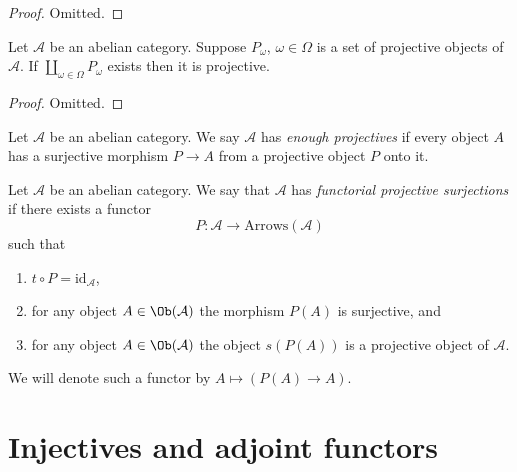 \begin{proof}
Omitted.
\end{proof}

\begin{lemma}
\label{lemma-coproduct-projectives}
Let $\mathcal{A}$ be an abelian category.
Suppose $P_\omega$, $\omega \in \Omega$ is a set of projective
objects of $\mathcal{A}$. If $\coprod_{\omega \in \Omega} P_\omega$
exists then it is projective.
\end{lemma}

\begin{proof}
Omitted.
\end{proof}

\begin{definition}
\label{definition-enough-projectives}
Let $\mathcal{A}$ be an abelian category.
We say $\mathcal{A}$ has {\it enough projectives}
if every object $A$ has a surjective morphism
$P \to A$ from a projective object $P$ onto it.
\end{definition}

\begin{definition}
\label{definition-functorial-projective-surjections}
Let $\mathcal{A}$ be an abelian category.
We say that $\mathcal{A}$ has {\it functorial projective surjections}
if there exists a functor
$$
P : \mathcal{A} \longrightarrow \text{Arrows}(\mathcal{A})
$$
such that
\begin{enumerate}
\item $t \circ P = \text{id}_\mathcal{A}$,
\item for any object $A \in \Ob(\mathcal{A})$
the morphism $P(A)$ is surjective, and
\item for any object $A \in \Ob(\mathcal{A})$
the object $s(P(A))$ is a projective object of $\mathcal{A}$.
\end{enumerate}
We will denote such a functor by
$A \mapsto (P(A) \to A)$.
\end{definition}

















\section{Injectives and adjoint functors}
\label{section-adjoint}

